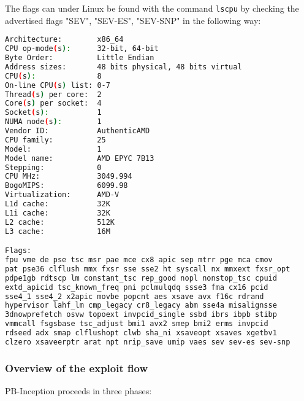 \documentclass[11pt,a4paper]{article}
\begin{document}
The flags can under Linux be found with the command \texttt{lscpu} by checking the advertised flags "SEV", "SEV-ES", "SEV-SNP" in the following way:
\begin{lstlisting}[language=bash]
Architecture:        x86_64
CPU op-mode(s):      32-bit, 64-bit
Byte Order:          Little Endian
Address sizes:       48 bits physical, 48 bits virtual
CPU(s):              8
On-line CPU(s) list: 0-7
Thread(s) per core:  2
Core(s) per socket:  4
Socket(s):           1
NUMA node(s):        1
Vendor ID:           AuthenticAMD
CPU family:          25
Model:               1
Model name:          AMD EPYC 7B13
Stepping:            0
CPU MHz:             3049.994
BogoMIPS:            6099.98
Virtualization:      AMD-V
L1d cache:           32K
L1i cache:           32K
L2 cache:            512K
L3 cache:            16M

Flags:
fpu vme de pse tsc msr pae mce cx8 apic sep mtrr pge mca cmov 
pat pse36 clflush mmx fxsr sse sse2 ht syscall nx mmxext fxsr_opt 
pdpe1gb rdtscp lm constant_tsc rep_good nopl nonstop_tsc cpuid 
extd_apicid tsc_known_freq pni pclmulqdq ssse3 fma cx16 pcid 
sse4_1 sse4_2 x2apic movbe popcnt aes xsave avx f16c rdrand 
hypervisor lahf_lm cmp_legacy cr8_legacy abm sse4a misalignsse 
3dnowprefetch osvw topoext invpcid_single ssbd ibrs ibpb stibp 
vmmcall fsgsbase tsc_adjust bmi1 avx2 smep bmi2 erms invpcid 
rdseed adx smap clflushopt clwb sha_ni xsaveopt xsaves xgetbv1 
clzero xsaveerptr arat npt nrip_save umip vaes sev sev-es sev-snp
\end{lstlisting}

\subsubsection{Overview of the exploit flow}
\label{sec:method:pb-inception:overview}
PB-Inception proceeds in three phases:
\end{document}
